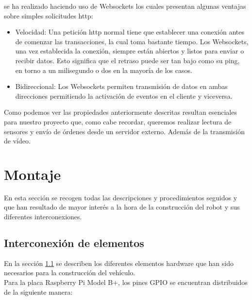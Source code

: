 se ha realizado haciendo uso de Websockets los cuales presentan algunas ventajas sobre simples solicitudes http:

\begin{itemize}
 \item Velocidad: Una petición http normal tiene que establecer una conexión antes de comenzar las transacciones, la cual toma bastante tiempo. 
 Los Websockets, una vez establecida la conexión, siempre están abiertos y listos para enviar o recibir datos. Esto significa que el retraso puede ser tan bajo como su ping,
 en torno a un milisegundo o dos en la mayoría de los casos.
 \item Bidireccional: Los Websockets permiten transmisión de datos en ambas direcciones permitiendo la activación de eventos en el cliente y viceversa.
\end{itemize}

Como podemos ver las propiedades anteriormente descritas resultan esenciales para nuestro proyecto que, como cabe recordar, queremos realizar lectura de sensores y envío de órdenes desde un servidor externo. Además de 
la transmisión de vídeo.\\

\section{Montaje}

En esta sección se recogen todas las descripciones y procedimientos seguidos y que han resultado de mayor interés a la hora de la construcción del robot y sus diferentes interconexiones.\\

\subsection{Interconexión de elementos}

En la sección \ref{} se describen los diferentes elementos hardware que han sido necesarios para la construcción del vehículo.\\

Para la placa Raspberry Pi Model B+, los pines GPIO se encuentran distribuidos de la siguiente manera:

